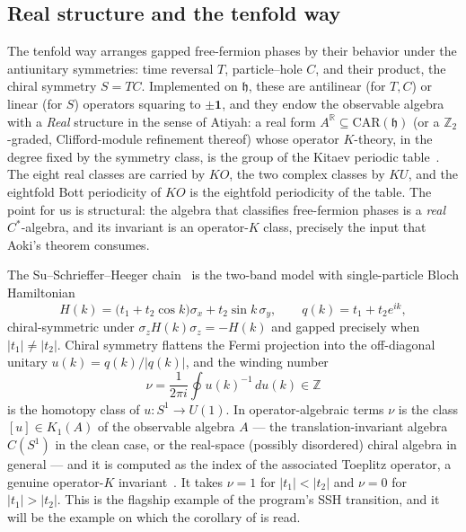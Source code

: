 \documentclass[12pt]{article}
\newcommand{\RR}{\mathbb{R}}
\newcommand{\ZZ}{\mathbb{Z}}
\newcommand{\abs}[1]{\lvert #1 \rvert}
\newcommand{\id}{\mathbf{1}}
\theoremstyle{plain}
\begin{document}
\subsection{Real structure and the tenfold way}

The tenfold way arranges gapped free-fermion phases by their behavior under the
antiunitary symmetries: time reversal $T$, particle--hole $C$, and their product, the
chiral symmetry $S=TC$. Implemented on $\mathfrak{h}$, these are antilinear (for $T,C$)
or linear (for $S$) operators squaring to $\pm\id$, and they endow the observable
algebra with a \emph{Real} structure in the sense of Atiyah: a real form
$A^{\RR}\subseteq\mathrm{CAR}(\mathfrak{h})$ (or a $\ZZ_{2}$-graded, Clifford-module
refinement thereof) whose operator $K$-theory, in the degree fixed by the symmetry
class, is the group of the Kitaev periodic
table~\cite{kitaev-periodic-table,thiang-ktheory,prodan-sb}. The eight real classes are
carried by $KO$, the two complex classes by $KU$, and the eightfold Bott periodicity of
$KO$ is the eightfold periodicity of the table. The point for us is structural: the
algebra that classifies free-fermion phases is a \emph{real} $C^{*}$-algebra, and its
invariant is an operator-$K$ class, precisely the input that Aoki's theorem consumes.

\begin{example}
\label{ex:ssh}
The Su--Schrieffer--Heeger chain~\cite{ssh-1979} is the two-band model with
single-particle Bloch Hamiltonian
\[
  H(k)=\bigl(t_{1}+t_{2}\cos k\bigr)\sigma_{x}+t_{2}\sin k\,\sigma_{y},
  \qquad q(k)=t_{1}+t_{2}e^{ik},
\]
chiral-symmetric under $\sigma_{z}H(k)\sigma_{z}=-H(k)$ and gapped precisely when
$\abs{t_{1}}\neq\abs{t_{2}}$. Chiral symmetry flattens the Fermi projection into the
off-diagonal unitary $u(k)=q(k)/\abs{q(k)}$, and the winding number
\[
  \nu=\frac{1}{2\pi i}\oint u(k)^{-1}\,du(k)\in\ZZ
\]
is the homotopy class of $u:S^{1}\to U(1)$. In operator-algebraic terms $\nu$ is the
class $[u]\in K_{1}(A)$ of the observable algebra $A$ --- the translation-invariant
algebra $C(S^{1})$ in the clean case, or the real-space (possibly disordered) chiral
algebra in general --- and it is computed as the index of the associated Toeplitz
operator, a genuine operator-$K$ invariant~\cite{prodan-sb,bourne-kellendonk-rennie}.
It takes $\nu=1$ for $\abs{t_{1}}<\abs{t_{2}}$ and $\nu=0$ for $\abs{t_{1}}>\abs{t_{2}}$.
This is the flagship example of the program's SSH transition, and it will be the
example on which the corollary of  is read.
\end{example}
\end{document}
